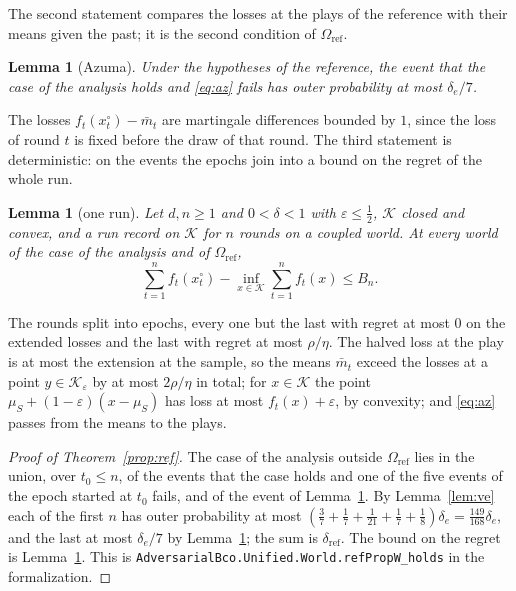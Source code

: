 \documentclass[11pt]{amsart}
\newtheorem{lemma}[theorem]{Lemma}
\theoremstyle{definition}
\numberwithin{equation}{section}
\newcommand{\cK}{\mathcal{K}}
\begin{document}
The second statement compares the losses at the plays of the reference with their means given the past; it is the second condition of $\Omega_{\mathrm{ref}}$.

\begin{lemma}[Azuma]\label{lem:az}
Under the hypotheses of the reference, the event that the case of the analysis holds and \eqref{eq:az} fails has outer probability at most $\delta_e/7$.
\end{lemma}

The losses $f_t(x^\circ_t)-\bar m_t$ are martingale differences bounded by $1$, since the loss of round $t$ is fixed before the draw of that round. The third statement is deterministic: on the events the epochs join into a bound on the regret of the whole run.

\begin{lemma}[one run]\label{lem:det}
Let $d,n\ge1$ and $0<\delta<1$ with $\varepsilon\le\frac12$, $\cK$ closed and convex, and a run record on $\cK$ for $n$ rounds on a coupled world. At every world of the case of the analysis and of $\Omega_{\mathrm{ref}}$,
\[
\sum_{t=1}^nf_t(x^\circ_t)-\inf_{x\in\cK}\sum_{t=1}^nf_t(x)\le B_n .
\]
\end{lemma}

The rounds split into epochs, every one but the last with regret at most $0$ on the extended losses and the last with regret at most $\rho/\eta$. The halved loss at the play is at most the extension at the sample, so the means $\bar m_t$ exceed the losses at a point $y\in\cK_\varepsilon$ by at most $2\rho/\eta$ in total; for $x\in\cK$ the point $\mu_S+(1-\varepsilon)(x-\mu_S)$ has loss at most $f_t(x)+\varepsilon$, by convexity; and \eqref{eq:az} passes from the means to the plays.

\begin{proof}[Proof of Theorem~\ref{prop:ref}]
The case of the analysis outside $\Omega_{\mathrm{ref}}$ lies in the union, over $t_0\le n$, of the events that the case holds and one of the five events of the epoch started at $t_0$ fails, and of the event of Lemma~\ref{lem:az}. By Lemma~\ref{lem:ve} each of the first $n$ has outer probability at most $(\frac37+\frac17+\frac1{21}+\frac17+\frac18)\delta_e=\frac{149}{168}\delta_e$, and the last at most $\delta_e/7$ by Lemma~\ref{lem:az}; the sum is $\delta_{\mathrm{ref}}$. The bound on the regret is Lemma~\ref{lem:det}.
This is \texttt{AdversarialBco.Unified.World.refPropW\_holds} in the formalization.
\end{proof}
\end{document}
